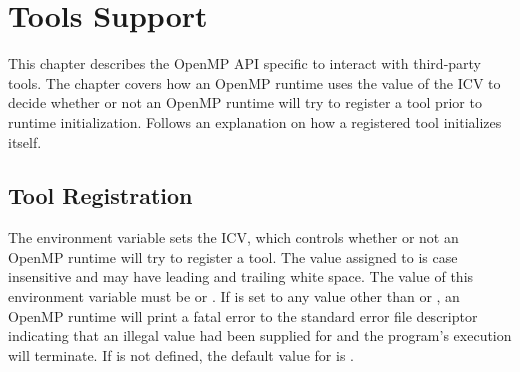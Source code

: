 %
%
%
%
%
%
%
%
%
%


\chapter{Tools Support}
\label{chap:ToolsSupport}

This chapter describes the OpenMP API specific to interact with third-party tools.
The chapter covers how an OpenMP runtime uses the value of the  ICV to decide whether or not an OpenMP runtime will try to register a tool prior to runtime initialization.
Follows an explanation on how a registered tool initializes itself.

\section{Tool Registration}
\label{sec:ToolsSupport_Registration}

The  environment variable sets the  ICV, which controls whether or not an OpenMP runtime will try to register a tool.
The value assigned to  is case insensitive and may have leading and trailing white space.
The value of this environment variable must be  or .
If  is set to any value other than  or , an OpenMP runtime will print a fatal error to the standard error file descriptor indicating that an illegal value had been supplied for  and the program's execution will terminate.
If  is not defined, the default value for  is .

